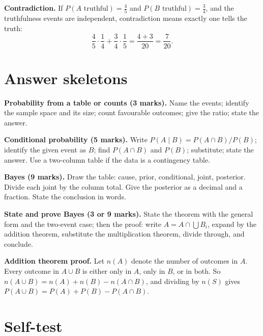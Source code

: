 \documentclass[11pt,a4paper]{article}
\begin{document}
\begin{exambox}
\textbf{Contradiction.} If $P(A\text{ truthful})=\frac45$ and $P(B\text{ truthful})=\frac34$, and the truthfulness events are independent, contradiction means exactly one tells the truth:
\[
\frac45\cdot\frac14+\frac34\cdot\frac15=\frac{4+3}{20}=\frac7{20}.
\]
\end{exambox}

\section{Answer skeletons}

\begin{answerbox}
\textbf{Probability from a table or counts (3 marks).} Name the events; identify the sample space and its size; count favourable outcomes; give the ratio; state the answer.
\end{answerbox}

\begin{answerbox}
\textbf{Conditional probability (5 marks).} Write $P(A\mid B)=P(A\cap B)/P(B)$; identify the given event as $B$; find $P(A\cap B)$ and $P(B)$; substitute; state the answer. Use a two-column table if the data is a contingency table.
\end{answerbox}

\begin{answerbox}
\textbf{Bayes (9 marks).} Draw the table: cause, prior, conditional, joint, posterior. Divide each joint by the column total. Give the posterior as a decimal and a fraction. State the conclusion in words.
\end{answerbox}

\begin{answerbox}
\textbf{State and prove Bayes (3 or 9 marks).} State the theorem with the general form and the two-event case; then the proof: write $A=A\cap\bigcup B_i$, expand by the addition theorem, substitute the multiplication theorem, divide through, and conclude.
\end{answerbox}

\begin{answerbox}
\textbf{Addition theorem proof.} Let $n(A)$ denote the number of outcomes in $A$. Every outcome in $A\cup B$ is either only in $A$, only in $B$, or in both. So $n(A\cup B)=n(A)+n(B)-n(A\cap B)$, and dividing by $n(S)$ gives $P(A\cup B)=P(A)+P(B)-P(A\cap B)$.
\end{answerbox}

\section{Self-test}
\end{document}
